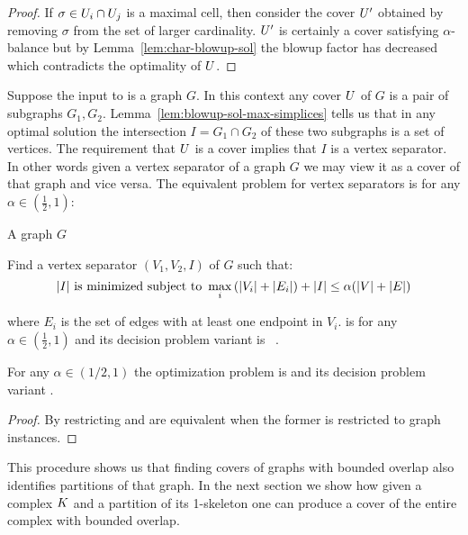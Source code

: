 \documentclass{elsarticle}
\begin{document}
\begin{proof}
If $\sigma \in U_i \cap U_j$ is a maximal cell, then consider the cover
$U'$ obtained by removing $\sigma$ from the set of larger
cardinality. $U'$ is certainly a cover satisfying $\alpha$-balance but
by Lemma~\ref{lem:char-blowup-sol} the blowup factor has decreased
which contradicts the optimality of $U$.
\end{proof}
\noindent Suppose the input to \ablp{} is a graph $G$. In this context any cover $U$ of $G$ is a pair of subgraphs $G_1,G_2$.
Lemma~\ref{lem:blowup-sol-max-simplices} tells us that in any optimal solution the intersection $I = G_1 \cap G_2$ of these two 
subgraphs is a set of vertices. The requirement that $U$ is a cover implies that $I$ is a vertex separator. In other words
given a vertex separator of a graph $G$ we may view it as a cover of that graph and vice versa. 
The equivalent problem for vertex separators is for any $\alpha \in (\frac{1}{2},1)$:
\begin{description}
\addtolength{\itemsep}{-.8\baselineskip}
\item[\textsc{Problem:}]  \avertex{}
\item[\textsc{Instance:}] A graph $G$
\item[\textsc{Goal:}] Find a vertex separator $(V_1,V_2,I)$ of $G$ such that: 
\[ |I| \textrm{ is minimized} \textrm{ subject to } \max_i{(|V_i| + |E_i|)} + |I| \leq \alpha(|V|+|E|)  \]
\end{description}
where $E_i$ is the set of edges with at least one endpoint in $V_i$. \avertex{} is \NPH{} for any $\alpha \in (\frac{1}{2},1)$ and its decision problem variant is \NPC{}~\cite{rhl-yaggpis-14}.
\begin{theorem}
For any $\alpha \in (1/2,1)$ the optimization problem \ablp{} is \NPH{} and its decision problem variant \NPC{}.
\end{theorem}
\begin{proof}
By restricting \ablp{} and \avertex{} are equivalent when the former is restricted to graph instances.
\end{proof}
This procedure shows us that finding covers of graphs with bounded overlap also identifies partitions of that graph.
In the next section we show how given a complex $K$ and a partition of its 1-skeleton one can produce a cover of the entire complex with bounded overlap.
\end{document}
